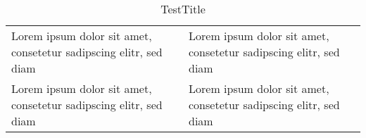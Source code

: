 
\begin{table}[htb]

\ifthenelse{\isundefined{\tabLenA}}{\newlength{\tabLenA}}{}
\ifthenelse{\isundefined{\tabLenB}}{\newlength{\tabLenB}}{}

\setlength{\tabLenA}{0.10\textwidth}
\setlength{\tabLenB}{0.20\textwidth}

\begin{tabularx}{\textwidth}{p{\tabLenA}p{\tabLenB}}
\toprule
\toprule

Lorem ipsum dolor sit amet, consetetur sadipscing elitr, sed diam
&

Lorem ipsum dolor sit amet, consetetur sadipscing elitr, sed diam
\\

Lorem ipsum dolor sit amet, consetetur sadipscing elitr, sed diam
&

Lorem ipsum dolor sit amet, consetetur sadipscing elitr, sed diam
\\
\bottomrule
\end{tabularx}
\caption{TestTitle}
\end{table}
